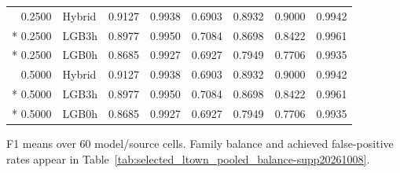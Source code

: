 \begin{longtable}{@{}rlrrrrrr@{}}
0.2500 & Hybrid & 0.9127 & 0.9938 & 0.6903 & 0.8932 & 0.9000 & 0.9942 \\*
0.2500 & LGB3h & 0.8977 & 0.9950 & 0.7084 & 0.8698 & 0.8422 & 0.9961 \\*
0.2500 & LGB0h & 0.8685 & 0.9927 & 0.6927 & 0.7949 & 0.7706 & 0.9935 \\
0.5000 & Hybrid & 0.9127 & 0.9938 & 0.6903 & 0.8932 & 0.9000 & 0.9942 \\*
0.5000 & LGB3h & 0.8977 & 0.9950 & 0.7084 & 0.8698 & 0.8422 & 0.9961 \\*
0.5000 & LGB0h & 0.8685 & 0.9927 & 0.6927 & 0.7949 & 0.7706 & 0.9935 \\
\end{longtable}
\noindent\footnotesize F1 means over 60 model/source cells. Family balance and achieved false-positive rates appear in Table~\ref{tab:selected_ltown_pooled_balance-supp20261008}.
\par\endgroup
